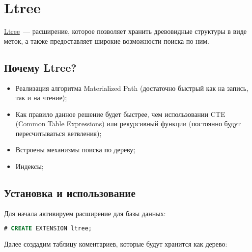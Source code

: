 \section{Ltree}

\href{https://www.postgresql.org/docs/current/static/ltree.html}{Ltree}~--- расширение, которое позволяет хранить древовидные структуры в виде меток, а также предоставляет широкие возможности поиска по ним.

\subsection{Почему Ltree?}

\begin{itemize}
  \item Реализация алгоритма Materialized Path (достаточно быстрый как на запись, так и на чтение);
  \item Как правило данное решение будет быстрее, чем использовании CTE (Common Table Expressions) или рекурсивный функции (постоянно будут пересчитываться ветвления);
  \item Встроены механизмы поиска по дереву;
  \item Индексы;
\end{itemize}

\subsection{Установка и использование}

Для начала активируем расширение для базы данных:

\begin{lstlisting}[language=SQL,label=lst:pgltree1,caption=Ltree]
# CREATE EXTENSION ltree;
\end{lstlisting}

Далее создадим таблицу коментариев, которые будут хранится как дерево:

